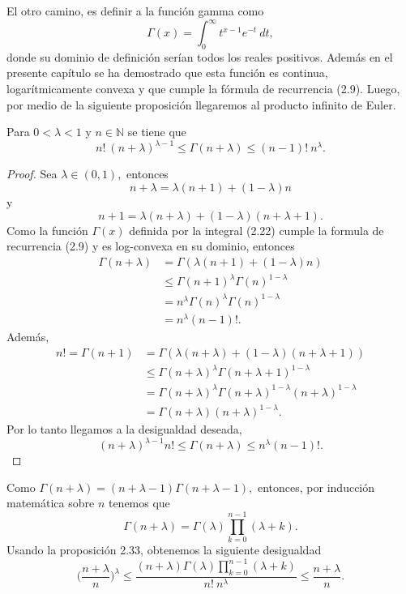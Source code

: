 El otro camino, es definir a la función gamma como 
\begin{equation}
	\Gamma(x) = \int_{0}^{\infty}t^{x-1}e^{-t}\ dt,
\end{equation} donde su dominio de definición serían todos los reales positivos. Además en el presente capítulo se ha demostrado que esta función es continua, logarítmicamente convexa y que cumple la fórmula de recurrencia (2.9). Luego, por medio de la siguiente proposición llegaremos al producto infinito de Euler.
\begin{proposition}
	Para $0 < \lambda < 1$ y $n \in \mathbb{N}$ se tiene que $$n!\ (n+\lambda)^{\lambda - 1} \leq \Gamma(n+\lambda) \leq (n-1)!\ n^\lambda.$$
\end{proposition}
\begin{proof}
	Sea $\lambda \in (0,1),$ entonces $$n+\lambda = \lambda (n+1)+(1-\lambda)n$$ y $$n + 1 = \lambda (n+\lambda)+(1-\lambda)(n+\lambda+1).$$ Como la función $\Gamma(x)$ definida por la integral (2.22) cumple la formula de recurrencia (2.9) y es log-convexa en su dominio, entonces 
	\begin{align*}
	\Gamma(n+\lambda) &= \Gamma(\lambda (n+1)+(1-\lambda)n)\\
	&\leq \Gamma(n+1)^\lambda \Gamma(n)^{1-\lambda}\\
	&= n^\lambda \Gamma(n)^\lambda \Gamma(n)^{1-\lambda}\\
	&= n^\lambda (n-1)!.
	\end{align*}
	Además, 
	\begin{align*}
	n! = \Gamma(n+1) &= \Gamma(\lambda (n+\lambda)+(1-\lambda)(n+\lambda+1))\\
	&\leq \Gamma(n+\lambda)^\lambda \Gamma(n+\lambda+1)^{1-\lambda}\\
	&= \Gamma(n+\lambda)^\lambda \Gamma(n+\lambda)^{1-\lambda}(n+\lambda)^{1-\lambda}\\
	&= \Gamma(n+\lambda)(n+\lambda)^{1-\lambda}.
	\end{align*}
	Por lo tanto llegamos a la desigualdad deseada, $$(n+\lambda)^{\lambda - 1}n! \leq \Gamma(n+\lambda) \leq n^\lambda (n-1)!.$$ 
\end{proof}
Como $\Gamma(n+\lambda) = (n+\lambda-1)\Gamma(n+\lambda-1),$ entonces, por inducción matemática sobre $n$ tenemos que $$\Gamma(n+\lambda) = \Gamma(\lambda)\prod_{k = 0}^{n-1}(\lambda+k).$$ Usando la proposición 2.33, obtenemos la siguiente desigualdad $$\bigg(\frac{n+\lambda}{n}\bigg)^\lambda \leq \frac{(n+\lambda)\Gamma(\lambda)\prod_{k = 0}^{n-1}(\lambda + k)}{n!\ n^\lambda} \leq \frac{n+\lambda}{n}.$$ 
